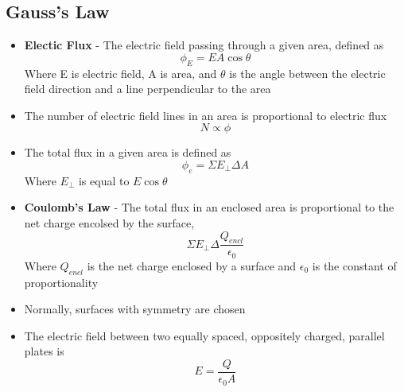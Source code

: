 \subsection{Gauss's Law}
\begin{itemize}
    \item \textbf{Electic Flux} - The electric field passing through a given area, defined as \[\phi_E=EA\cos\theta\] Where E is electric field, A is area, and \(\theta\) is the angle between the electric field direction and a line perpendicular to the area
    \item The number of electric field lines in an area is proportional to electric flux \[N\propto\phi\] 
    \item The total flux in a given area is defined as \[\phi_e=\Sigma E_{\bot}\Delta A\] Where \(E_{\bot}\) is equal to \(E\cos\theta\)
    \item \textbf{Coulomb's Law} - The total flux in an enclosed area is proportional to the net charge encolsed by the surface, \[\Sigma E_{\bot}\Delta\frac{Q_{encl}}{\epsilon_0}\] Where \(Q_{encl}\) is the net charge enclosed by a surface and \(\epsilon_0\) is the constant of proportionality
    \item Normally, surfaces with symmetry are chosen
    \item The electric field between two equally spaced, oppositely charged, parallel plates is \[E=\frac{Q}{\epsilon_0 A}\]
\end{itemize}

\newpage